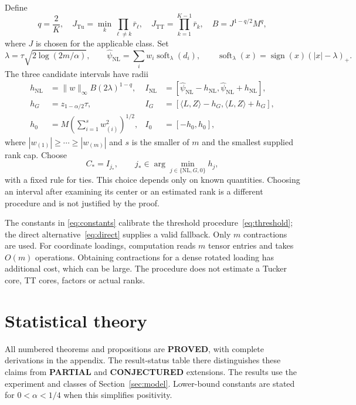 \documentclass[11pt]{article}
\theoremstyle{remark}
\newcommand{\ip}[2]{\langle #1,#2\rangle}
\newcommand{\norm}[1]{\lVert #1\rVert}
\newcommand{\soft}{\operatorname{soft}}
\newcommand{\Tu}{\mathrm{Tu}}
\newcommand{\TT}{\mathrm{TT}}
\newcommand{\NL}{\mathrm{NL}}
\begin{document}
Define
\begin{equation}\label{eq:constants}
 q=\frac2K,\quad
 J_{\Tu}=\min_k\prod_{\ell\ne k}\bar r_\ell,\quad
 J_{\TT}=\prod_{k=1}^{K-1}\bar r_k,\quad B=J^{1-q/2}M^q,
\end{equation}
where $J$ is chosen for the applicable class. Set
\begin{equation}\label{eq:threshold}
 \lambda=\tau\sqrt{2\log(2m/\alpha)},\qquad
 \widehat\psi_{\NL}=\sum_iw_i\soft_\lambda(d_i),\qquad
 \soft_\lambda(x)=\operatorname{sign}(x)(|x|-\lambda)_+.
\end{equation}
The three candidate intervals have radii
\begin{align}
 h_{\NL}&=\norm w_\infty B(2\lambda)^{1-q},&
 I_{\NL}&=[\widehat\psi_{\NL}-h_{\NL},\widehat\psi_{\NL}+h_{\NL}],\label{eq:nl}\\
 h_G&=z_{1-\alpha/2}\tau,&
 I_G&=[\ip LZ-h_G,\ip LZ+h_G],\label{eq:direct}\\
 h_0&=M\left(\sum_{i=1}^s w_{(i)}^2\right)^{1/2},&
 I_0&=[-h_0,h_0],\label{eq:zero}
\end{align}
where $|w_{(1)}|\ge\cdots\ge|w_{(m)}|$ and $s$ is the smaller of $m$ and the smallest supplied rank cap. Choose
\begin{equation}\label{eq:select}
 C_*=I_{j_*},\qquad j_*\in\arg\min_{j\in\{\NL,G,0\}}h_j,
\end{equation}
with a fixed rule for ties. This choice depends only on known quantities. Choosing an interval after examining its center or an estimated rank is a different procedure and is not justified by the proof.

The constants in \eqref{eq:constants} calibrate the threshold procedure~\eqref{eq:threshold}; the direct alternative~\eqref{eq:direct} supplies a valid fallback. Only $m$ contractions are used. For coordinate loadings, computation reads $m$ tensor entries and takes $O(m)$ operations. Obtaining contractions for a dense rotated loading has additional cost, which can be large. The procedure does not estimate a Tucker core, TT cores, factors or actual ranks.

\section{Statistical theory}\label{sec:theory}

All numbered theorems and propositions are \textbf{PROVED}, with complete derivations in the appendix. The result-status table there distinguishes these claims from \textbf{PARTIAL} and \textbf{CONJECTURED} extensions. The results use the experiment and classes of Section~\ref{sec:model}. Lower-bound constants are stated for $0<\alpha<1/4$ when this simplifies positivity.
\end{document}
